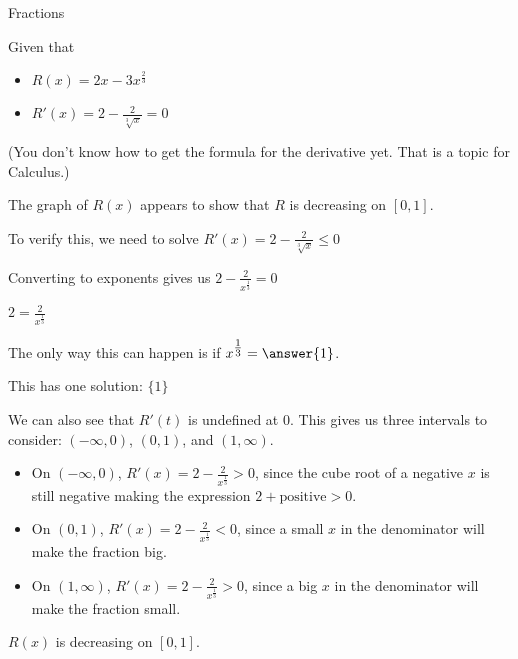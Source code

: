 \documentclass{ximera}
\begin{document}
\begin{example}  Fractions


Given that

\begin{itemize}
\item $R(x) = 2x - 3 x^{\tfrac{2}{3}}$
\item $R'(x) = 2 - \frac{2}{\sqrt[3]{x}} = 0$
\end{itemize}
(You don't know how to get the formula for the derivative yet.  That is a topic for Calculus.)

The graph of $R(x)$ appears to show that $R$ is decreasing on $[0, 1]$.
\begin{center}
\end{center}










To verify this, we need to solve $R'(x) = 2 - \frac{2}{\sqrt[3]{x}}  \leq 0$



\begin{explanation}


Converting to exponents gives us $2 - \frac{2}{x^{\tfrac{1}{3}}} = 0$


$2 = \frac{2}{x^{\tfrac{1}{3}}}$

The only way this can happen is if $x^{\tfrac{1}{3}} = \answer{1}$.

This has one solution: $\{  1  \}$



We can also see that $R'(t)$ is undefined at $0$.  This gives us three intervals to consider: $(-\infty, 0)$, $(0, 1)$, and $(1, \infty)$.



\begin{itemize}
\item On $(-\infty, 0)$, $R'(x) = 2 - \frac{2}{x^{\tfrac{1}{3}}} > 0$, since the cube root of a negative $x$ is still negative making the expression $2 + \text{positive} > 0$.
\item On $(0,1)$, $R'(x) = 2 - \frac{2}{x^{\tfrac{1}{3}}} < 0$, since a small $x$ in the denominator will make the fraction big.
\item On $(1,\infty)$, $R'(x) = 2 - \frac{2}{x^{\tfrac{1}{3}}} > 0$, since a big $x$ in the denominator will make the fraction small.
\end{itemize}


$R(x)$ is decreasing on $[0,1]$.


\end{explanation}
\end{example}
\end{document}
